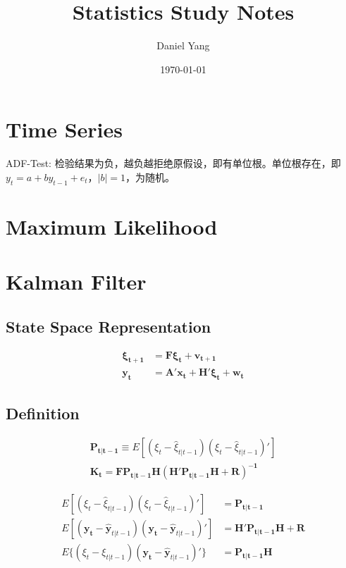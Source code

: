\documentclass[11pt]{article}
\title{Statistics Study Notes}
\author{Daniel Yang}
\date{\today}
\begin{document}
\maketitle

\section{Time Series}

ADF-Test: 检验结果为负，越负越拒绝原假设，即有单位根。单位根存在，即$y_t = a + b y_{t-1} + e_t$，$|b|=1$，为随机。

\section{Maximum Likelihood}

\section{Kalman Filter}

\subsection{State Space Representation}
$$
\begin{aligned}
   \mathbf{\xi_{t+1}} &= \mathbf{F \xi_{t}} + \mathbf{v_{t+1}} \\
   \mathbf{y_{t}} &= \mathbf{A'} \mathbf{x_{t}} + \mathbf{H'\xi_{t}} + \mathbf{w_t}
\end{aligned}
$$

\subsection{Definition}

$$
\begin{aligned}
    \mathbf{P_{t|t-1}} \equiv E[(\xi_{t} - \hat{\xi}_{t|t-1})(\xi_{t} - \hat{\xi}_{t|t-1})'] \\
    \mathbf{K_t} = \mathbf{FP_{t|t-1}H(H'P_{t|t-1}H+R)^{-1}}
\end{aligned}
$$

$$
\begin{aligned}
    E[(\xi_{t} - \hat{\xi}_{t|t-1})(\xi_{t} - \hat{\xi}_{t|t-1})'] &= \mathbf{P_{t|t-1}} \\
    E[(\mathbf{y_t} - \hat{\mathbf{y}}_{t|t-1})(\mathbf{y_t} - \hat{\mathbf{y}}_{t|t-1})'] &= \mathbf{H'P_{t|t-1}H+R} \\
    E\{(\xi_t - \xi_{t|t-1})(\mathbf{y_t} - \hat{\mathbf{y}}_{t|t-1})'\} &= \mathbf{P_{t|t-1}H} \\
\end{aligned}
$$
\end{document}

